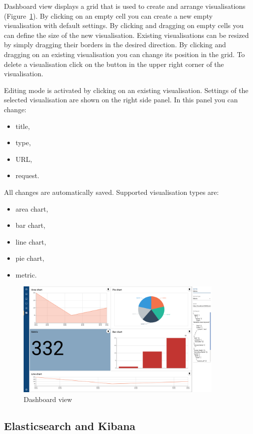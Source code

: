 Dashboard view displays a grid that is used to create and arrange visualisations (Figure~\ref{fig:dashboard}).
By clicking on an empty cell you can create a new empty visualisation with default settings.
By clicking and dragging on empty cells you can define the size of the new visualisation.
Existing visualisations can be resized by simply dragging their borders in the desired direction.
By clicking and dragging on an existing visualisation you can change its position in the grid.
To delete a visualisation click on the button in the upper right corner of the visualisation.

Editing mode is activated by clicking on an existing visualisation.
Settings of the selected visualisation are shown on the right side panel.
In this panel you can change:
\begin{itemize}
  \item title,
  \item type,
  \item URL,
  \item request.
\end{itemize}
All changes are automatically saved.
Supported visualisation types are:
\begin{itemize}
  \item area chart,
  \item bar chart,
  \item line chart,
  \item pie chart,
  \item metric.
\end{itemize}

\begin{figure}
  \centering
  \includegraphics[width=0.9\textwidth]{images/dashboard_view.png}
  \caption{Dashboard view}
  \label{fig:dashboard}
\end{figure}

\subsection{Elasticsearch and Kibana}\label{subsec:elasticsearch-and-kibana}

